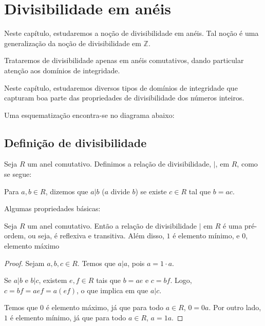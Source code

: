 \chapter{Divisibilidade em anéis}
Neste capítulo, estudaremos a noção de divisibilidade em anéis.
Tal noção é uma generalização da noção de divisibilidade em $\mathbb Z$.

Trataremos de divisibilidade apenas em anéis comutativos, dando particular atenção aos domínios de integridade.

Neste capítulo, estudaremos diversos tipos de domínios de integridade que capturam boa parte das propriedades de divisibilidade dos números inteiros.

Uma esquematização encontra-se no diagrama abaixo:

\begin{center}
\end{center}

\section{Definição de divisibilidade}


\begin{definition}
Seja $R$ um anel comutativo. Definimos a relação de divisibilidade, $|$, em $R$, como se segue:

Para $a, b \in R$, dizemos que $a|b$ ($a$ divide $b$) se existe $c \in R$ tal que $b=ac$.
\end{definition}
Algumas propriedades básicas:
\begin{prop}
    Seja $R$ um anel comutativo.
    Então a relação de divisibilidade $|$ em $R$ é uma pré-ordem, ou seja, é reflexiva e transitiva. Além disso, $1$ é elemento mínimo, e $0$, elemento máximo
\end{prop}

\begin{proof}Sejam $a, b, c \in R$.
    Temos que $a|a$, pois $a=1\cdot a$.

    Se $a|b$ e $b|c$, existem $e, f \in R$ tais que $b=ae$ e $c=bf$.
    Logo, $c=bf=aef=a(ef)$, o que implica em que $a|c$.

    Temos que $0$ é elemento máximo, já que para todo $a \in R$, $0=0a$.
    Por outro lado, $1$ é elemento mínimo, já que para todo $a \in R$, $a=1a$.
\end{proof}

